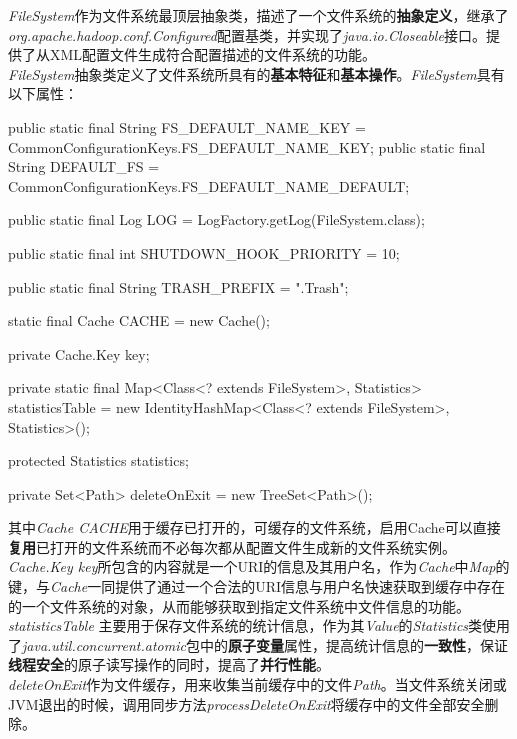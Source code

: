     \textit{FileSystem}作为文件系统最顶层抽象类，描述了一个文件系统的\textbf{抽象定义}，继承了\textit{org.apache.hadoop.conf.Configured}配置基类，并实现了\textit{java.io.Closeable}接口。提供了从XML配置文件生成符合配置描述的文件系统的功能。\\
    \textit{FileSystem}抽象类定义了文件系统所具有的\textbf{基本特征}和\textbf{基本操作}。\textit{FileSystem}具有以下属性：
    \begin{java}[caption=FileSystem attribute]
public static final String FS_DEFAULT_NAME_KEY = 
    CommonConfigurationKeys.FS_DEFAULT_NAME_KEY;
public static final String DEFAULT_FS = 
    CommonConfigurationKeys.FS_DEFAULT_NAME_DEFAULT;

public static final Log LOG = LogFactory.getLog(FileSystem.class);

public static final int SHUTDOWN_HOOK_PRIORITY = 10;

public static final String TRASH_PREFIX = ".Trash";

static final Cache CACHE = new Cache();

private Cache.Key key;

private static final Map<Class<? extends FileSystem>, Statistics> 
    statisticsTable =
        new IdentityHashMap<Class<? extends FileSystem>, Statistics>();

protected Statistics statistics;

private Set<Path> deleteOnExit = new TreeSet<Path>();

    \end{java}
    其中\textit{Cache CACHE}用于缓存已打开的，可缓存的文件系统，启用Cache可以直接\textbf{复用}已打开的文件系统而不必每次都从配置文件生成新的文件系统实例。\\
    \textit{Cache.Key key}所包含的内容就是一个URI的信息及其用户名，作为\textit{Cache}中\textit{Map}的键，与\textit{Cache}一同提供了通过一个合法的URI信息与用户名快速获取到缓存中存在的一个文件系统的对象，从而能够获取到指定文件系统中文件信息的功能。\\
    \textit{statisticsTable} 主要用于保存文件系统的统计信息，作为其\textit{Value}的\textit{Statistics}类使用了\textit{java.util.concurrent.atomic}包中的\textbf{原子变量}属性，提高统计信息的\textbf{一致性}，保证\textbf{线程安全}的原子读写操作的同时，提高了\textbf{并行性能}。\\
        \textit{deleteOnExit}作为文件缓存，用来收集当前缓存中的文件\textit{Path}。当文件系统关闭或JVM退出的时候，调用同步方法\textit{processDeleteOnExit}将缓存中的文件全部安全删除。\\
